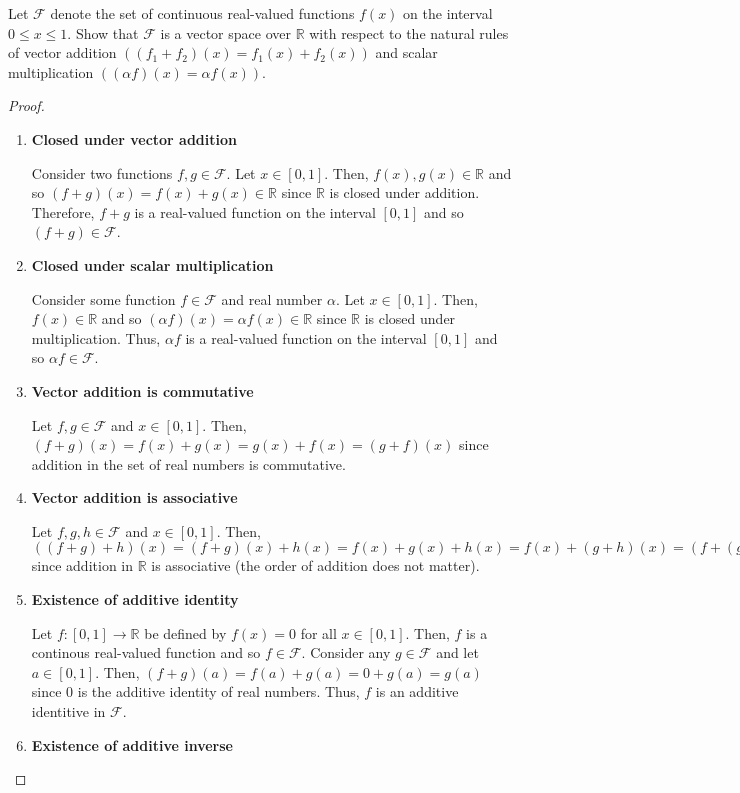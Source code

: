 \documentclass[12pt]{article}
\newcommand{\R}{\mathbb{R}}
\newenvironment{problem}[2][Problem]{\begin{trivlist} \item[\hskip \labelsep {\bfseries #1}\hskip \labelsep {\bfseries #2.}]}{\end{trivlist}}
\begin{document}
    \begin{problem}{1.5}
      Let $\mathcal{F}$ denote the set of continuous real-valued functions $f(x)$ on the interval $0\leq x\leq 1$. Show that $\mathcal{F}$ is a vector space over $\R$ with respect to the natural rules of vector addition $\left( \left( f_{1} + f_{2} \right)(x) = f_{1}(x) + f_{2}(x) \right)$ and scalar multiplication $\left( (\alpha f)(x) = \alpha f(x) \right)$.
      \begin{proof}
      \begin{enumerate}
	\item \textbf{Closed under vector addition}

	  Consider two functions $f,g \in \mathcal{F}$. Let $x\in [0,1]$. Then, $f(x), g(x) \in \R$ and so $(f + g)(x) = f(x) + g(x) \in \R$ since $\R$ is closed under addition. Therefore, $f+g$ is a real-valued function on the interval $[0,1]$ and so $(f+g)\in \mathcal{F}$.
	\item \textbf{Closed under scalar multiplication}

	  Consider some function $f\in \mathcal{F}$ and real number $\alpha$. Let $x\in [0,1]$. Then, $f(x)\in \R$ and so $ (\alpha f)(x) = \alpha f(x) \in \R$ since $\R$ is closed under multiplication. Thus, $\alpha f$ is a real-valued function on the interval $[0,1]$ and so $\alpha f \in \mathcal{F}$.  
	\item \textbf{Vector addition is commutative}

	  Let $f,g\in \mathcal{F}$ and $x\in [0,1]$. Then, $(f+g)(x) = f(x) + g(x) = g(x) + f(x) = (g+f)(x)$ since addition in the set of real numbers is commutative.
	\item \textbf{Vector addition is associative}

	  Let $f,g,h \in \mathcal{F}$ and $x\in [0,1]$. Then, $\left( \left( f+g \right)+h \right)(x) = (f+g)(x) + h(x) = f(x)+g(x)+h(x) = f(x) + (g+h)(x) = \left( f +\left( g+h\right) \right)(x)$ since addition in $\R$ is associative (the order of addition does not matter).
	\item \textbf{Existence of additive identity}

	  Let $f:[0,1]\to \R$ be defined by $f(x) = 0$ for all $x\in [0,1]$. Then, $f$ is a continous real-valued function and so $f\in \mathcal{F}$. Consider any $g\in \mathcal{F}$ and let $a\in [0,1]$. Then, $(f + g)(a) = f(a) + g(a) = 0+ g(a) = g(a)$ since $0$ is the additive identity  of real numbers. Thus, $f$ is an additive identitive in $\mathcal{F}$. 
	\item \textbf{Existence of additive inverse}


\end{enumerate}
\end{proof}
\end{problem}
\end{document}
